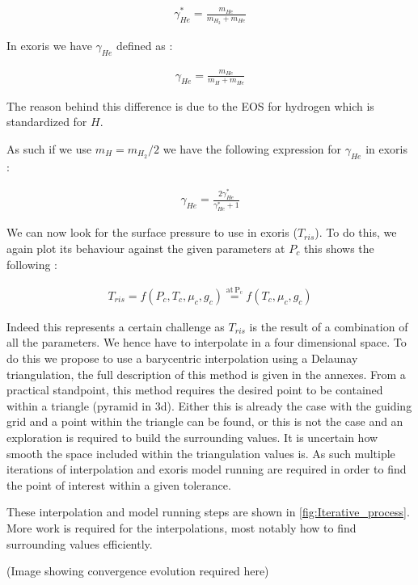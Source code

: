 \begin{align} 
    \gamma_{He}^* = \frac{m_{He}}{m_{H_2}+m_{He}}
\end{align}

In exoris we have  $\gamma_{He}$ defined as :

\begin{align} 
    \gamma_{He} = \frac{m_{He}}{m_{H}+m_{He}}
\end{align}

The reason behind this difference is due to the EOS for hydrogen which is standardized for $H$.

As such if we use $m_H = m_{H_2}/2$ we have the following expression for  $\gamma_{He}$ in exoris :

\begin{align} 
    \gamma_{He} = \frac{2\gamma_{He}^*}{\gamma_{He}^*+1}
\end{align}

We can now look for the surface pressure to use in exoris ($T_{ris}$). To do this, we again plot its behaviour against the given parameters at $P_c$ this shows the following :

\begin{align} 
    T_{ris} = f(P_c,T_c,\mu_c,g_c) \overset{\mathrm{at \, P_c}}{=} f(T_c,\mu_c,g_c)
\end{align}

Indeed this represents a certain challenge as $T_{ris}$ is the result of a combination of all the parameters. We hence have to interpolate in a four dimensional space. To do this we propose to use a barycentric interpolation using a Delaunay triangulation, the full description of this method is given in the annexes. From a practical standpoint, this method requires the desired point to be contained within a triangle (pyramid in 3d). Either this is already the case with the guiding grid and a point within the triangle can be found, or this is not the case and an exploration is required to build the surrounding values. It is uncertain how smooth the space included within the triangulation values is. As such multiple iterations of interpolation and exoris model running are required in order to find the point of interest within a given tolerance. \par

These interpolation and model running steps are shown in \cref{fig:Iterative_process}. More work is required for the interpolations, most notably how to find surrounding values efficiently.

(Image showing convergence evolution required here)